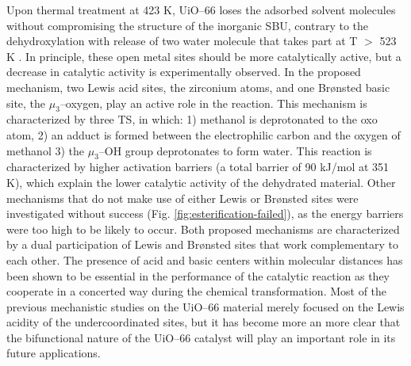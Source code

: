 Upon thermal treatment at 423 K, UiO--66 loses the adsorbed solvent molecules without compromising the structure of the inorganic SBU, contrary to the dehydroxylation with release of two water molecule that takes part at T $>$ 523 K \cite{shearer2013situ}. In principle, these open metal sites should be more catalytically active, but a decrease in catalytic activity is experimentally observed. In the proposed mechanism, two Lewis acid sites, the zirconium atoms, and one Br\o{}nsted basic site, the $\mu_3$--oxygen, play an active role in the reaction. This mechanism is characterized by three TS, in which: 1) methanol is deprotonated to the oxo atom, 2) an adduct is formed between the electrophilic carbon and the oxygen of methanol 3) the $\mu_3$--OH group deprotonates to form water. This reaction is characterized by higher activation barriers (a total barrier of 90 kJ/mol at 351 K), which explain the lower catalytic activity of the dehydrated material.
\npar
Other mechanisms that do not make use of either Lewis or Br\o{}nsted sites were investigated without success (Fig. \ref{fig:esterification-failed}), as the energy barriers were too high to be likely to occur. Both proposed mechanisms are characterized by a dual participation of Lewis and Br\o{}nsted sites that work complementary to each other. The presence of acid and basic centers within molecular distances has been shown to be essential in the performance of the catalytic reaction as they cooperate in a concerted way during the chemical transformation. Most of the previous mechanistic studies on the UiO--66 material merely focused on the Lewis acidity of the undercoordinated sites, but it has become more an more clear that the bifunctional nature of the UiO--66 catalyst will play an important role in its future applications.

